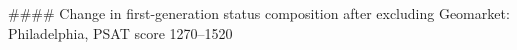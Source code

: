#### Change in first-generation status composition after excluding Geomarket: Philadelphia, PSAT score 1270–1520

